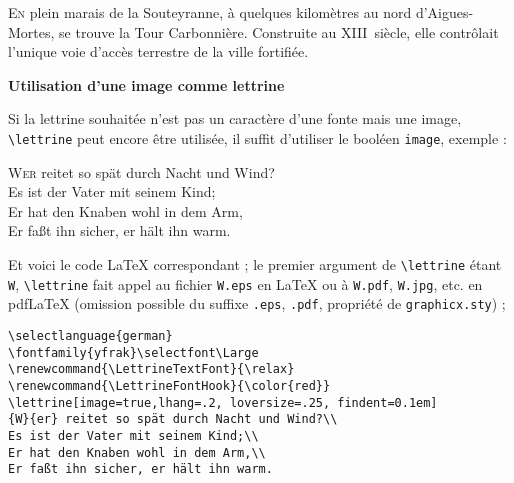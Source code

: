 \documentclass[12pt,a4paper]{article}
\begin{document}
{%
\renewcommand{\LettrineFontHook}{%
  \fontfamily{pag}\fontseries{bx}\fontshape{it}\color{red}}

\lettrine[findent=.3em]{E}{n} plein marais de la Souteyranne, à quelques
kilomètres au nord d'Aigues-Mortes, se trouve la Tour Carbonnière.
Construite au XIII\ieme~siècle, elle contrôlait l'unique voie d'accès
terrestre de la ville fortifiée.
\par}%

\newpage
\begin{center}
\large\bfseries Utilisation d'une image comme lettrine
\end{center}

\vspace{\baselineskip}
Si la lettrine souhaitée n'est pas un caractère d'une fonte mais une
image, \verb+\lettrine+ peut encore être utilisée, il suffit
d'utiliser le booléen \texttt{image}, exemple :

{%
\selectfont\Large
\renewcommand{\LettrineTextFont}{\relax}
\renewcommand{\LettrineFontHook}{\color{red}}
\lettrine[image=true,lhang=.2, loversize=.25, findent=0.1em]
{W}{er} reitet so spät durch Nacht und Wind?\\
Es ist der Vater mit seinem Kind;\\
Er hat den Knaben wohl in dem Arm,\\
Er faßt ihn sicher, er hält ihn warm.
\par}%

\vspace{\baselineskip}
Et voici le code \LaTeX{} correspondant ;
le  premier argument de \verb+\lettrine+ étant \verb+W+,
\verb+\lettrine+ fait appel au fichier \verb+W.eps+ en \LaTeX{}
ou à \verb+W.pdf+, \verb+W.jpg+, etc. en pdf\LaTeX{} (omission
possible du suffixe \verb+.eps+,  \verb+.pdf+, propriété de
\verb+graphicx.sty+) ;

\begin{verbatim}
\selectlanguage{german}
\fontfamily{yfrak}\selectfont\Large
\renewcommand{\LettrineTextFont}{\relax}
\renewcommand{\LettrineFontHook}{\color{red}}
\lettrine[image=true,lhang=.2, loversize=.25, findent=0.1em]
{W}{er} reitet so spät durch Nacht und Wind?\\
Es ist der Vater mit seinem Kind;\\
Er hat den Knaben wohl in dem Arm,\\
Er faßt ihn sicher, er hält ihn warm.
\end{verbatim}
\end{document}
